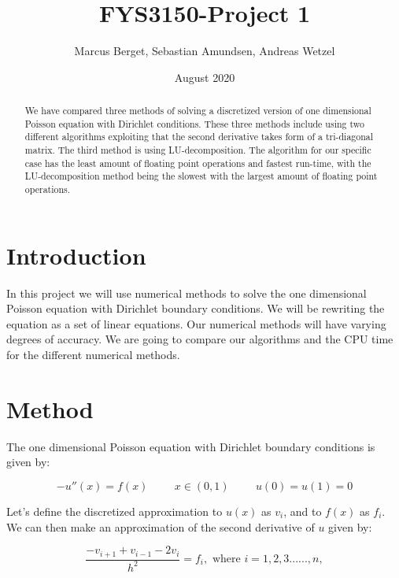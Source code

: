\documentclass[norsk,a4paper,12pt]{article}
\begin{document}
\title{FYS3150-Project 1}
\author{Marcus Berget, Sebastian Amundsen, Andreas Wetzel}
\date{August 2020}
\maketitle

\begin{abstract}
We have compared three methods of solving a discretized version of one dimensional Poisson equation with Dirichlet  conditions. These three methods include using two different algorithms exploiting that the second derivative takes form of a tri-diagonal matrix. The third method is using LU-decomposition. The algorithm for our specific case has the least amount of floating point operations and fastest run-time, with the LU-decomposition method being the slowest with the largest amount of floating point operations. 
\end{abstract}

\section{Introduction}

In this project we will use numerical methods to solve the one dimensional Poisson equation with Dirichlet boundary conditions. We will be rewriting the equation as a set of linear equations. Our numerical methods will have varying degrees of accuracy. We are going to compare our algorithms and the CPU time for the different numerical methods. 

\section{Method}
The one dimensional Poisson equation with Dirichlet boundary conditions is given by:

\begin{equation}
-u''(x)=f(x) \hspace{1cm} x \in (0,1) \hspace{1cm} u(0)=u(1)=0
 \label{eq:udd}
 \end{equation}

Let's define the discretized approximation to $u(x)$ as $v_i$, and to $f(x)$ as $f_i$. We can then make an approximation of the second derivative of $u$ given by:

\begin{equation}
\frac{-v_{i+1}+v_{i-1}-2v_i}{h^2}=f_i, \textrm{  where  } i=1,2,3......,n,
 \label{eq:2der}
 \end{equation}
 
\end{document}
